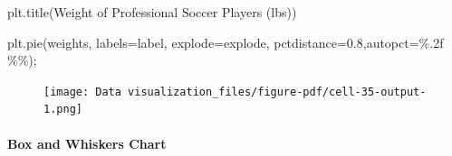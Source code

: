\documentclass[
  letterpaper,
  DIV=11,
  numbers=noendperiod]{scrreprt}
\let\oldparagraph\paragraph
\renewcommand{\paragraph}[1]{\oldparagraph{#1}\mbox{}}
\newenvironment{Shaded}{\begin{snugshade}}{\end{snugshade}}
\newcommand{\FloatTok}[1]{\textcolor[rgb]{0.68,0.00,0.00}{#1}}
\newcommand{\NormalTok}[1]{\textcolor[rgb]{0.00,0.23,0.31}{#1}}
\newcommand{\OperatorTok}[1]{\textcolor[rgb]{0.37,0.37,0.37}{#1}}
\newcommand{\SpecialCharTok}[1]{\textcolor[rgb]{0.37,0.37,0.37}{#1}}
\newcommand{\StringTok}[1]{\textcolor[rgb]{0.13,0.47,0.30}{#1}}
\begin{document}
\begin{Shaded}
\begin{Highlighting}[]
\NormalTok{plt.title(}\StringTok{\textquotesingle{}Weight of Professional Soccer Players (lbs)\textquotesingle{}}\NormalTok{)}

\NormalTok{plt.pie(weights, labels}\OperatorTok{=}\NormalTok{label, explode}\OperatorTok{=}\NormalTok{explode, pctdistance}\OperatorTok{=}\FloatTok{0.8}\NormalTok{,autopct}\OperatorTok{=}\StringTok{\textquotesingle{}}\SpecialCharTok{\%.2f}\StringTok{ }\SpecialCharTok{\%\%}\StringTok{\textquotesingle{}}\NormalTok{)}\OperatorTok{;}
\end{Highlighting}
\end{Shaded}

\begin{figure}[H]

{\centering \texttt{[image: Data visualization\_files/figure-pdf/cell-35-output-1.png]}

}

\end{figure}

\hypertarget{box-and-whiskers-chart}{%
\paragraph{Box and Whiskers Chart}\label{box-and-whiskers-chart}}
\end{document}
